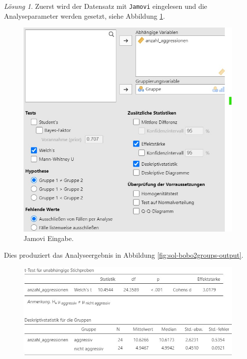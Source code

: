 \documentclass[
]{book}
\theoremstyle{definition}
\theoremstyle{definition}
\theoremstyle{definition}
\theoremstyle{definition}
\theoremstyle{remark}
\newtheorem*{solution}{Lösung}
\begin{document}
\begin{solution}

Zuerst wird der Datensatz mit \texttt{Jamovi} eingelesen und die Analyseparameter werden gesetzt, siehe Abbildung \ref{fig:sol-bobo2groups-input}.

\begin{figure}

{\centering \includegraphics[width=1\linewidth]{figures/06-exr-bobo2groups-jmv-input} 

}

\caption{Jamovi Eingabe.}\label{fig:sol-bobo2groups-input}
\end{figure}

Dies produziert das Analyseergebnis in Abbildung \ref{fig:sol-bobo2groups-output}.

\begin{figure}

{\centering \includegraphics[width=1\linewidth]{figures/06-exr-bobo2groups-jmv-output} 

}
\end{figure}
\end{solution}
\end{document}

